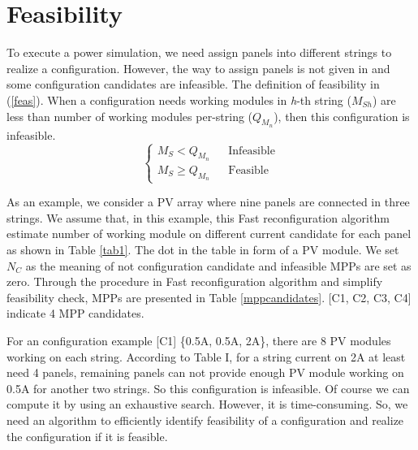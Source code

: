 \documentclass[conference]{IEEEtran}
\begin{document}
\section{Feasibility}\label{feasPro}
To execute a power simulation, we need assign panels into different strings to realize a configuration. However, the way to assign panels is not given in \cite{b10} and some configuration candidates are infeasible. 
The definition of feasibility in (\ref{feas}). When a configuration needs working modules in \textit{h}-th string (\textit{$M_{Sh}$}) are less than number of working modules per-string (\textit{$Q_{M_{n}}$}), then this configuration is infeasible. 
\begin{equation}
\left\{\begin{matrix}
M_S < Q_{M_{n}} & & \text{Infeasible}\\ 
M_S \geqslant Q_{M_{n}} & & \text{Feasible} 
\label{feas}
\end{matrix}\right. 
\end{equation}

As an example, we consider a PV array where nine panels are connected in three strings. We assume that, in this example, this Fast reconfiguration algorithm estimate number of working module on different current candidate for each panel as shown in Table \ref{tab1}. The dot in the table in form of a PV module. We set $N_C$ as the meaning of not configuration candidate and infeasible MPPs are set as zero. Through the procedure in Fast reconfiguration algorithm and simplify feasibility check, MPPs are presented in Table \ref{mppcandidates}. [C1, C2, C3, C4] indicate 4 MPP candidates.

For an configuration example [C1] \{0.5A, 0.5A, 2A\}, there are 8 PV modules working on each string. According to Table I, for a string current on 2A at least need 4 panels, remaining panels can not provide enough PV module working on 0.5A for another two strings. So this configuration is infeasible.
Of course we can compute it by using an exhaustive search. However, it is time-consuming. So, we need an algorithm to efficiently identify feasibility of a configuration and realize the configuration if it is feasible.
\end{document}
